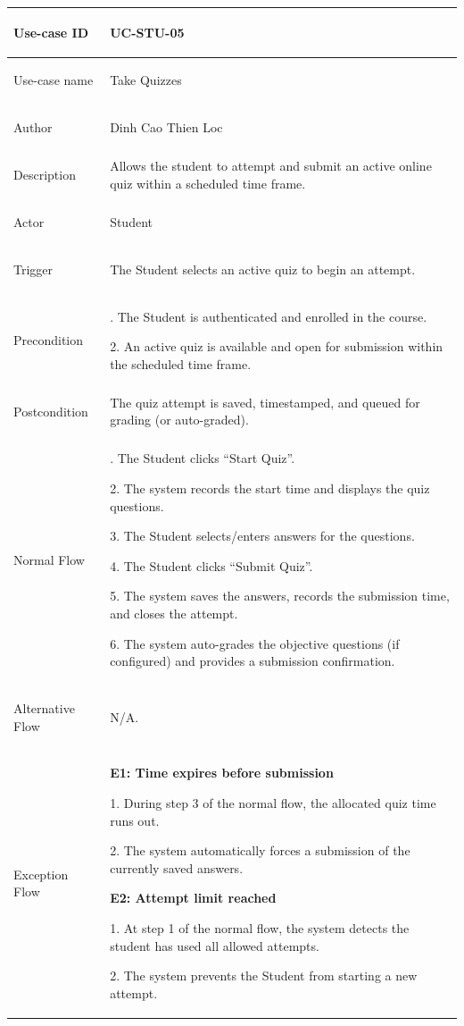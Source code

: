 {
\renewcommand{\arraystretch}{1.1}
\setlength{\tabcolsep}{8pt}
\begin{longtable}{|>{\bfseries\raggedright\arraybackslash}p{}|>{\raggedright\arraybackslash}p{}|}
\hline
Use-case ID & UC-STU-05 \\ \hline
Use-case name & Take Quizzes \\ \hline
Author & Dinh Cao Thien Loc \\ \hline
Description & Allows the student to attempt and submit an active online quiz within a scheduled time frame. \\ \hline
Actor & Student \\ \hline
Trigger & The Student selects an active quiz to begin an attempt. \\ \hline
Precondition &
1. The Student is authenticated and enrolled in the course. \par
2. An active quiz is available and open for submission within the scheduled time frame. \\ \hline
Postcondition & The quiz attempt is saved, timestamped, and queued for grading (or auto-graded). \\ \hline
Normal Flow &
1. The Student clicks ``Start Quiz''. \par
2. The system records the start time and displays the quiz questions. \par
3. The Student selects/enters answers for the questions. \par
4. The Student clicks ``Submit Quiz''. \par
5. The system saves the answers, records the submission time, and closes the attempt. \par
6. The system auto-grades the objective questions (if configured) and provides a submission confirmation. \\ \hline
Alternative Flow & N/A. \\ \hline
Exception Flow &
\textbf{E1: Time expires before submission} \par
1. During step 3 of the normal flow, the allocated quiz time runs out. \par
2. The system automatically forces a submission of the currently saved answers. \par\vspace{4pt}
\textbf{E2: Attempt limit reached} \par
1. At step 1 of the normal flow, the system detects the student has used all allowed attempts. \par
2. The system prevents the Student from starting a new attempt. \\ \hline
\end{longtable}
}

